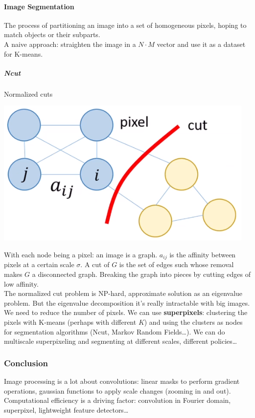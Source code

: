 \documentclass[10pt]{report}
\begin{document}
\paragraph{Image Segmentation} The process of partitioning an image into a set of homogeneous pixels, hoping to match objects or their subparts.\\
A naive approach: straighten the image in a $N\cdot M$ vector and use it as a dataset for K-means.\\
\subparagraph{Ncut} Normalized cuts
\begin{center}
	\includegraphics[scale=0.5]{9.png}
\end{center}
With each node being a pixel: an image is a graph. $a_{ij}$ is the affinity between pixels at a certain scale $\sigma$. A cut of $G$ is the set of edges such whose removal makes $G$ a disconnected graph. Breaking the graph into pieces by cutting edges of low affinity.\\
The normalized cut problem is NP-hard, approximate solution as an eigenvalue problem. But the eigenvalue decomposition it's really intractable with big images. We need to reduce the number of pixels. We can use \textbf{superpixels}: clustering the pixels with K-means (perhaps with different $K$) and using the clusters as nodes for segmentation algorithms (Ncut, Markov Random Fields\ldots). We can do multiscale superpixeling and segmenting at different scales, different policies\ldots\\
\subsubsection{Conclusion}
Image processing is a lot about convolutions: linear masks to perform gradient operations, gaussian functions to apply scale changes (zooming in and out). Computational efficiency is a driving factor: convolution in Fourier domain, superpixel, lightweight feature detectors\ldots
\end{document}
